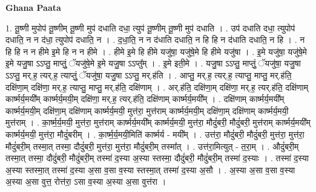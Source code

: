 \documentclass[17pt]{extarticle}
\begin{document}
\textbf{Ghana Paata } \newline

1. तू॒ष्णी मुपोप॑ तू॒ष्णीम् तू॒ष्णी मुप॑ दधाति दधा॒ त्युप॑ तू॒ष्णीम् तू॒ष्णी मुप॑ दधाति । . उप॑ दधाति दधा॒ त्युपोप॑ दधाति॒ न न द॑धा॒ त्युपोप॑ दधाति॒ न । . द॒धा॒ति॒ न न द॑धाति दधाति॒ न हि हि न द॑धाति दधाति॒ न हि । . न हि हि न न हीमे इ॒मे हि न न हीमे । . हीमे इ॒मे हि हीमे यजु॑षा॒ यजु॑षे॒मे हि हीमे यजु॑षा । . इ॒मे यजु॑षा॒ यजु॑षे॒मे इ॒मे यजु॒षा ऽऽप्तु॒ माप्तुं॒ ॅयजु॑षे॒मे इ॒मे यजु॒षा ऽऽप्तु᳚म् । . इ॒मे इती॒मे । . यजु॒षा ऽऽप्तु॒ माप्तुं॒ ॅयजु॑षा॒ यजु॒षा ऽऽप्तु॒ मर्.ह॒ त्यर्.ह॒ त्याप्तुं॒ ॅयजु॑षा॒ यजु॒षा ऽऽप्तु॒ मर्.ह॑ति । . आप्तु॒ मर्.ह॒ त्यर्.ह॒ त्याप्तु॒ माप्तु॒ मर्.ह॑ति॒ दक्षि॑णा॒म् दक्षि॑णा॒ मर्.ह॒ त्याप्तु॒ माप्तु॒ मर्.ह॑ति॒ दक्षि॑णाम् । . अर्.ह॑ति॒ दक्षि॑णा॒म् दक्षि॑णा॒ मर्.ह॒ त्यर्.ह॑ति॒ दक्षि॑णाम् कार्ष्मर्य॒मयी᳚म् कार्ष्मर्य॒मयी॒म् दक्षि॑णा॒ मर्.ह॒ त्यर्.ह॑ति॒ दक्षि॑णाम् कार्ष्मर्य॒मयी᳚म् । . दक्षि॑णाम् कार्ष्मर्य॒मयी᳚म् कार्ष्मर्य॒मयी॒म् दक्षि॑णा॒म् दक्षि॑णाम् कार्ष्मर्य॒मयी॒ मुत्त॑रा॒ मुत्त॑राम् कार्ष्मर्य॒मयी॒म् दक्षि॑णा॒म् दक्षि॑णाम् कार्ष्मर्य॒मयी॒ मुत्त॑राम् । . का॒र्ष्म॒र्य॒मयी॒ मुत्त॑रा॒ मुत्त॑राम् कार्ष्मर्य॒मयी᳚म् कार्ष्मर्य॒मयी॒ मुत्त॑रा॒ मौदुं॑बरी॒ मौदुं॑बरी॒ मुत्त॑राम् कार्ष्मर्य॒मयी᳚म् कार्ष्मर्य॒मयी॒ मुत्त॑रा॒ मौदुं॑बरीम् । . का॒र्ष्म॒र्य॒मयी॒मिति॑ कार्ष्मर्य - मयी᳚म् । . उत्त॑रा॒ मौदुं॑बरी॒ मौदुं॑बरी॒ मुत्त॑रा॒ मुत्त॑रा॒ मौदुं॑बरी॒म् तस्मा॒त् तस्मा॒ दौदुं॑बरी॒ मुत्त॑रा॒ मुत्त॑रा॒ मौदुं॑बरी॒म् तस्मा᳚त् । . उत्त॑रा॒मित्युत् - त॒रा॒म् । . औदुं॑बरी॒म् तस्मा॒त् तस्मा॒ दौदुं॑बरी॒ मौदुं॑बरी॒म् तस्मा॑ द॒स्या अ॒स्या स्तस्मा॒ दौदुं॑बरी॒ मौदुं॑बरी॒म् तस्मा॑ द॒स्याः । . तस्मा॑ द॒स्या अ॒स्या स्तस्मा॒त् तस्मा॑ द॒स्या अ॒सा व॒सा व॒स्या स्तस्मा॒त् तस्मा॑ द॒स्या अ॒सौ । . अ॒स्या अ॒सा व॒सा व॒स्या अ॒स्या अ॒सा वुत्त॒ रोत्त॑रा॒ ऽसा व॒स्या अ॒स्या अ॒सा वुत्त॑रा । \newline
\end{document}
